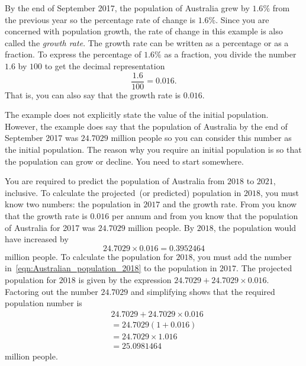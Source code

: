 \documentclass[a4paper,oneside,12pt]{article}
\begin{document}
\begin{solution}
By the end of September 2017, the population of Australia grew by
$1.6\%$ from the previous year so the percentage rate of change is
$1.6\%$.  Since you are concerned with population growth, the rate of
change in this example is also called the \emph{growth rate}.  The
growth rate can be written as a percentage or as a fraction.  To
express the percentage of $1.6\%$ as a fraction, you divide the number
$1.6$ by $100$ to get the decimal representation
\[
\frac{1.6}{100}
=
0.016.
\]
That is, you can also say that the growth rate is $0.016$.

The example does not explicitly state the value of the initial
population.  However, the example does say that the population of
Australia by the end of September 2017 was $24.7029$ million people so
you can consider this number as the initial population.  The reason
why you require an initial population is so that the population can
grow or decline.  You need to start somewhere.

You are required to predict the population of Australia from $2018$ to
$2021$, inclusive.  To calculate the projected~(or predicted)
population in $2018$, you must know two numbers: the population in
$2017$ and the growth rate.
From  you know that
the growth rate is $0.016$ per annum and
from  you
know that the population of Australia for 2017 was $24.7029$ million
people.  By $2018$, the population would have increased by
\begin{equation}
\label{eqn:Australian_population_2018}
24.7029 \times 0.016
=
0.3952464
\end{equation}
million people.  To calculate the population for $2018$, you must add
the number in~\eqref{eqn:Australian_population_2018} to the population
in $2017$.  The projected population for $2018$ is given by the
expression $24.7029 + 24.7029 \times 0.016$.  Factoring out the number
$24.7029$ and simplifying shows that the required population number is
\begin{equation}
\label{eqn:Australian_population_2018_calculation}
\begin{aligned}
&24.7029 + 24.7029 \times 0.016 \\[4pt]
&=
24.7029 (1 + 0.016) \\[4pt]
&=
24.7029 \times 1.016 \\[4pt]
&=
25.0981464
\end{aligned}
\end{equation}
million people.


\end{solution}
\end{document}
